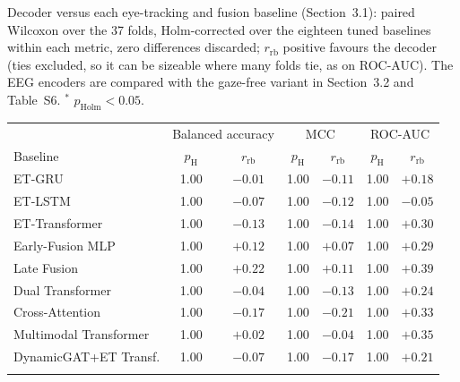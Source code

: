 \documentclass[pdflatex,sn-basic,Numbered]{sn-jnl}
\makeatletter
\newenvironment{suptable}{\par\bigskip\noindent\begin{minipage}{\textwidth}\def\@captype{table}\centering\tablebodyfont}{\end{minipage}\par\bigskip}
\makeatother
\begin{document}
\begin{suptable}
\caption{Decoder versus each eye-tracking and fusion baseline (Section~3.1): paired Wilcoxon over the 37 folds, Holm-corrected over the eighteen tuned baselines within each metric, zero differences discarded; $r_{\mathrm{rb}}$ positive favours the decoder (ties excluded, so it can be sizeable where many folds tie, as on ROC-AUC). The EEG encoders are compared with the gaze-free variant in Section~3.2 and Table~S6. $^{*}$ $p_{\mathrm{Holm}}<0.05$.}\label{tabS10}
\scriptsize
\setlength{\tabcolsep}{3pt}\begin{tabular*}{\linewidth}{@{\extracolsep{\fill}}lcccccc@{}}
\toprule
& \multicolumn{2}{c}{Balanced accuracy} & \multicolumn{2}{c}{MCC} & \multicolumn{2}{c}{ROC-AUC} \\
\cmidrule(lr){2-3}\cmidrule(lr){4-5}\cmidrule(lr){6-7}
Baseline & $p_{\mathrm{H}}$ & $r_{\mathrm{rb}}$ & $p_{\mathrm{H}}$ & $r_{\mathrm{rb}}$ & $p_{\mathrm{H}}$ & $r_{\mathrm{rb}}$ \\
\midrule
ET-GRU & 1.00 & $-0.01$ & 1.00 & $-0.11$ & 1.00 & $+0.18$ \\
ET-LSTM & 1.00 & $-0.07$ & 1.00 & $-0.12$ & 1.00 & $-0.05$ \\
ET-Transformer & 1.00 & $-0.13$ & 1.00 & $-0.14$ & 1.00 & $+0.30$ \\
Early-Fusion MLP & 1.00 & $+0.12$ & 1.00 & $+0.07$ & 1.00 & $+0.29$ \\
Late Fusion & 1.00 & $+0.22$ & 1.00 & $+0.11$ & 1.00 & $+0.39$ \\
Dual Transformer & 1.00 & $-0.04$ & 1.00 & $-0.13$ & 1.00 & $+0.24$ \\
Cross-Attention & 1.00 & $-0.17$ & 1.00 & $-0.21$ & 1.00 & $+0.33$ \\
Multimodal Transformer & 1.00 & $+0.02$ & 1.00 & $-0.04$ & 1.00 & $+0.35$ \\
DynamicGAT+ET Transf. & 1.00 & $-0.07$ & 1.00 & $-0.17$ & 1.00 & $+0.21$ \\
\botrule
\end{tabular*}
\end{suptable}
\end{document}
